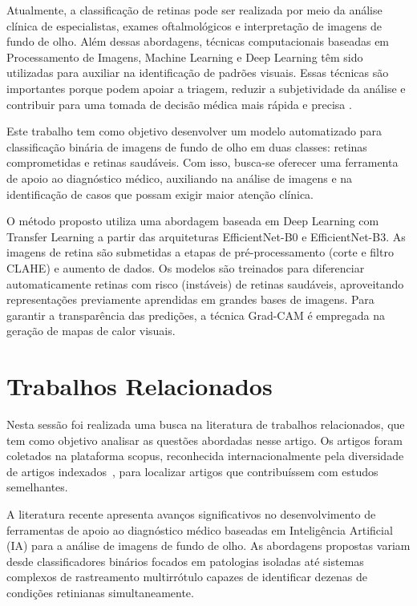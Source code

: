 \documentclass[12pt]{article}
\begin{document}
Atualmente, a classificação de retinas pode ser realizada por meio da análise
clínica de especialistas, exames oftalmológicos e interpretação de imagens de
fundo de olho. Além dessas abordagens, técnicas computacionais baseadas em
Processamento de Imagens, Machine Learning e Deep Learning têm sido utilizadas
para auxiliar na identificação de padrões visuais. Essas técnicas são
importantes porque podem apoiar a triagem, reduzir a subjetividade da análise e
contribuir para uma tomada de decisão médica mais rápida e precisa \cite{Advances}.

Este trabalho tem como objetivo desenvolver um modelo automatizado para
classificação binária de imagens de fundo de olho em duas classes: retinas
comprometidas e retinas saudáveis. Com isso, busca-se oferecer uma ferramenta de
apoio ao diagnóstico médico, auxiliando na análise de imagens e na identificação
de casos que possam exigir maior atenção clínica.

O método proposto utiliza uma abordagem baseada em Deep Learning com Transfer
Learning a partir das arquiteturas EfficientNet-B0 e EfficientNet-B3. As imagens de retina são
submetidas a etapas de pré-processamento (corte e filtro CLAHE) e aumento de dados. Os modelos são
treinados para diferenciar automaticamente retinas com risco (instáveis) de retinas
saudáveis, aproveitando representações previamente aprendidas em grandes bases
de imagens. Para garantir a transparência das predições, a técnica Grad-CAM é empregada na geração de mapas de calor visuais.

\section{Trabalhos Relacionados}

Nesta sessão foi realizada uma busca na literatura de trabalhos relacionados, que tem como objetivo analisar as questões abordadas nesse artigo. Os artigos foram coletados na plataforma scopus, reconhecida internacionalmente pela diversidade de artigos indexados~\cite{keele:2007}, para localizar artigos que contribuíssem com estudos semelhantes.

A literatura recente apresenta avanços significativos no desenvolvimento de ferramentas de apoio ao diagnóstico médico baseadas em Inteligência Artificial (IA) para a análise de imagens de fundo de olho. As abordagens propostas variam desde classificadores binários focados em patologias isoladas até sistemas complexos de rastreamento multirrótulo capazes de identificar dezenas de condições retinianas simultaneamente.
\end{document}
